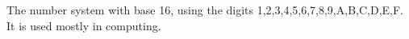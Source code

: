 The number system with base 16, using the digits
1,2,3,4,5,6,7,8,9,A,B,C,D,E,F. It is used mostly in
computing.

